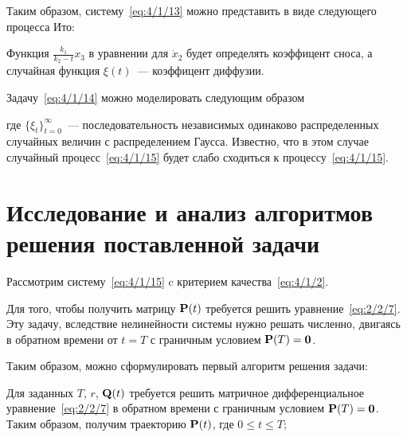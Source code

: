 Таким образом, систему~\ref{eq:4/1/13} можно представить в виде следующего процесса Ито:

\eeq

Функция $\frac{k_1}{k_2 - t} x_3$ в уравнении для $\dot{x}_2$ будет определять коэффицент сноса, а случайная функция $\xi(t)$~--- коэффицент диффузии.

Задачу~\ref{eq:4/1/14} можно моделировать следующим образом

\eeq

где $\{\xi_t\}_{t=0}^\infty$~--- последовательность независимых одинаково распределенных случайных величин с распределением Гаусса. Известно\cite{ARKHIPOV}, что в этом случае случайный процесс~\ref{eq:4/1/15} будет слабо сходиться к процессу~\ref{eq:4/1/15}.



\section{Исследование и анализ алгоритмов решения поставленной задачи}



Рассмотрим систему~\ref{eq:4/1/15} c критерием качества~\ref{eq:4/1/2}.

Для того, чтобы получить матрицу $\mathbf{P}(t)$ требуется решить уравнение~\vref{eq:2/2/7}. Эту задачу, вследствие нелинейности системы нужно решать численно, двигаясь в обратном времени от $t=T$ с граничным условием $\mathbf{P}(T) = \mathbf{0}$.

Таким образом, можно сформулировать первый алгоритм решения задачи:

	\benum
		\item
			Для заданных $T$, $r$, $\mathbf{Q}(t)$ требуется решить матричное дифференциальное уравнение~\ref{eq:2/2/7} в обратном времени с граничным условием $\mathbf{P}(T) = \mathbf{0}$. Таким образом, получим траекторию $\mathbf{P}(t)$, где $0 \leqslant t \leqslant T$;
			
